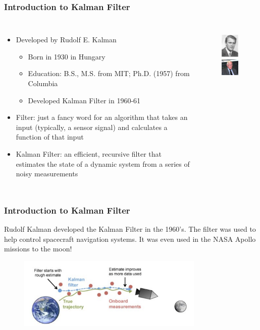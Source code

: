 \documentclass{beamer}
\begin{document}
\begin{frame}
	\frametitle{Introduction to Kalman Filter}
	\begin{columns}
			\begin{itemize}
				\item Developed by Rudolf E. Kalman
					\begin{itemize}
						\item Born in 1930 in Hungary
						\item Education: B.S., M.S. from MIT; Ph.D. (1957) from Columbia
						\item Developed Kalman Filter in 1960-61
					\end{itemize}
				\item Filter: just a fancy word for an algorithm that takes an input (typically, a sensor signal) and calculates a function of that input
				\item Kalman Filter: an efficient, recursive filter that estimates the state of a dynamic system from a series of noisy measurements
			\end{itemize}
		\begin{figure}
			\centering
			\includegraphics[width=2cm]{kalman.jpeg}\\
			\includegraphics[width=2cm]{kalman21.jpeg}
		\end{figure}%
	\end{columns}
\end{frame}

\begin{frame}
	\frametitle{Introduction to Kalman Filter}
	Rudolf Kalman developed the Kalman Filter in the 1960’s. The
	filter was used to help control spacecraft navigation systems. It
	was even used in the NASA Apollo missions to the moon!
	\begin{figure}
			\includegraphics[width=3.5in]{aerospace.png}
		\end{figure}
\end{frame}
\end{document}
